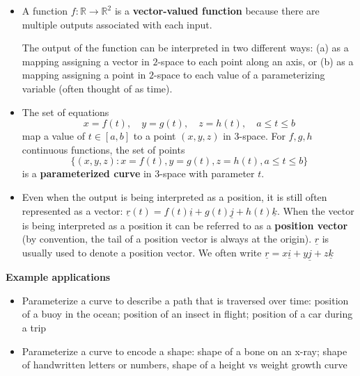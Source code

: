 \documentclass[12pt,letterpaper,noanswers]{exam}
\newcommand{\mb}[1]{\underline{#1}}
\begin{document}
\begin{tcolorbox}
\begin{itemize}
\itemsep0em
    \item A function $f: \mathbb{R} \rightarrow \mathbb{R}^2$ is a \textbf{vector-valued function} because there are multiple outputs associated with each input.  
    
    The output of the function can be interpreted in two different ways: (a) as a mapping assigning a vector in $2$-space to each point along an axis, or (b) as a mapping assigning a point in $2$-space to each value of a parameterizing variable (often thought of as time).
    \item The set of equations 
\[x = f(t), \quad y = g(t), \quad z = h(t), \quad a\leq t \leq b\]
map a value of $t\in [a,b]$ to a point $(x,y,z)$ in 3-space.  For $f,g,h$ continuous functions, the set of points \[\{(x,y,z): x= f(t), y=g(t), z= h(t), a\leq t \leq b\}\] is a \textbf{parameterized curve} in 3-space with parameter $t$.
\item Even when the output is being interpreted as a position, it is still often represented as a vector: $\mb{r}(t) = f(t)\mb{i} + g(t)\mb{j} + h(t)\mb{k}$.  When the vector is being interpreted as a position it can be referred to as a \textbf{position vector} (by convention, the tail of a position vector is always at the origin).  $\mb{r}$ is usually used to denote a position vector.  We often write $\mb{r} = x\mb i + y \mb j + z \mb k$
\end{itemize}
\end{tcolorbox}


\noindent\textbf{Example applications} 
\begin{tcolorbox}
\begin{itemize}
\item Parameterize a curve to describe a path that is traversed over time: position of a buoy in the ocean; position of an insect in flight; position of a car during a trip
\item Parameterize a curve to encode a shape: shape of a bone on an x-ray; shape of handwritten letters or numbers, shape of a height vs weight growth curve
\end{itemize}


\end{tcolorbox}
\end{document}
